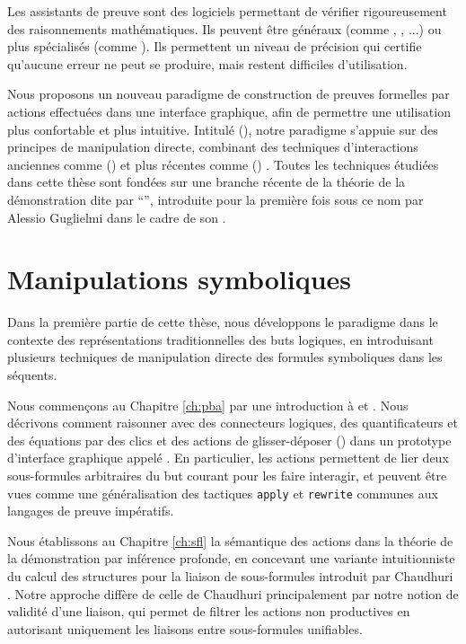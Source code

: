 Les assistants de preuve sont des logiciels permettant de vérifier rigoureusement des raisonnements mathématiques. Ils peuvent être généraux (comme  \cite{the_coq_development_team_2022_7313584},  \cite{10.1007/978-3-030-79876-5_37},  \cite{nipkow2002isabelle}...) ou plus spécialisés (comme  \cite{Barthe2014}). Ils permettent un niveau de précision qui certifie qu'aucune erreur ne peut se produire, mais restent difficiles d'utilisation.

Nous proposons un nouveau paradigme de construction de preuves formelles par actions effectuées dans une interface graphique, afin de permettre une utilisation plus confortable et plus intuitive. Intitulé  (), notre paradigme s'appuie sur des principes de manipulation directe, combinant des techniques d'interactions anciennes comme  () \cite{PbP} et plus récentes comme  () \cite{chaudhuri_certifying_2022}. Toutes les techniques étudiées dans cette thèse sont fondées sur une branche récente de la théorie de la démonstration dite par ``'', introduite pour la première fois sous ce nom par Alessio Guglielmi dans le cadre de son  \cite{Guglielmi1999ACO}.

\section*{Manipulations symboliques}

Dans la première partie de cette thèse, nous développons le paradigme  dans le contexte des représentations traditionnelles des buts logiques, en introduisant plusieurs techniques de manipulation directe des formules symboliques dans les séquents.

Nous commençons au Chapitre \ref{ch:pba} par une introduction à  et . Nous décrivons comment raisonner avec des connecteurs logiques, des quantificateurs et des équations par des clics et des actions de glisser-déposer () dans un prototype d'interface graphique appelé  \cite{Actema:link}. En particulier, les actions  permettent de lier deux sous-formules arbitraires du but courant pour les faire interagir, et peuvent être vues comme une généralisation des tactiques \texttt{apply} et \texttt{rewrite} communes aux langages de preuve impératifs.

Nous établissons au Chapitre \ref{ch:sfl} la sémantique des actions  dans la théorie de la démonstration par inférence profonde, en concevant une variante intuitionniste du calcul des structures pour la liaison de sous-formules introduit par Chaudhuri \cite{Chaudhuri2013}. Notre approche diffère de celle de Chaudhuri principalement par notre notion de validité d'une liaison, qui permet de filtrer les actions  non productives en autorisant uniquement les liaisons entre sous-formules unifiables.

